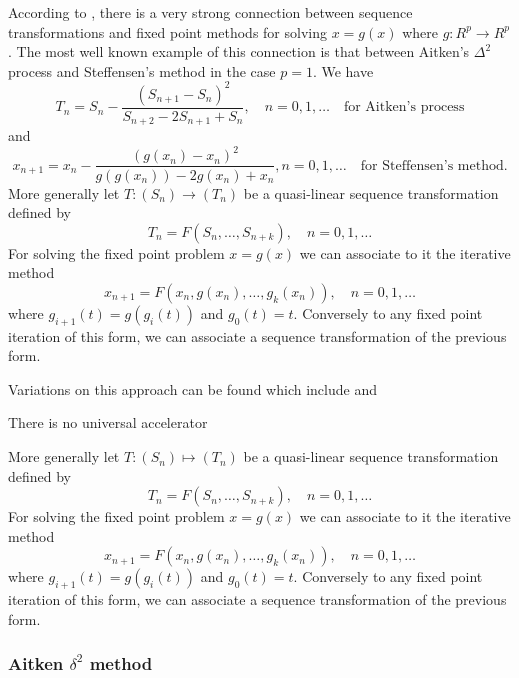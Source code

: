 According to \cite{brezinski}, there is a very strong connection between sequence transformations and fixed point methods for solving \(x=g(x)\) where \(g: R^{p} \to R^{p}\).
The most well known example of this connection is that between Aitken's \(\Delta^{2}\) process and Steffensen's method in the case \(p=1\).
We have
\[T_{n}=S_{n}-\frac{\left(S_{n+1}-S_{n}\right)^{2}}{S_{n+2}-2 S_{n+1}+S_{n}}, \quad n=0,1, \ldots \quad\text{for Aitken's process}\]
and
\[x_{n+1}=x_{n}-\frac{\left(g\left(x_{n}\right)-x_{n}\right)^{2}}{g\left(g\left(x_{n}\right)\right)-2 g\left(x_{n}\right)+x_{n}}, n=0,1, \ldots \quad\text{for Steffensen's method.}\]
More generally let \(T:\left(S_{n}\right) \to\left(T_{n}\right)\) be a quasi-linear sequence transformation defined by
\[
T_{n}=F\left(S_{n}, \ldots, S_{n+k}\right), \quad n=0,1, \ldots
\]
For solving the fixed point problem \(x=g(x)\) we can associate to it the iterative method
\[
x_{n+1}=F\left(x_{n}, g\left(x_{n}\right), \ldots, g_{k}\left(x_{n}\right)\right), \quad n=0,1, \ldots
\]
where \(g_{i+1}(t)=g\left(g_{i}(t)\right)\) and \(g_{0}(t)=t\).
Conversely to any fixed point iteration of this form, we can associate a sequence transformation of the previous form.

Variations on this approach can be found which include \cite{irons_version_1969} and \cite{king}

There is no universal accelerator \cite{brezinski}





More generally let \(T:\left(S_{n}\right) \longmapsto\left(T_{n}\right)\) be a quasi-linear sequence transformation defined by
\[
T_{n}=F\left(S_{n}, \ldots, S_{n+k}\right), \quad n=0,1, \ldots
\]
For solving the fixed point problem \(x=g(x)\) we can associate to it the iterative method
\[
x_{n+1}=F\left(x_{n}, g\left(x_{n}\right), \ldots, g_{k}\left(x_{n}\right)\right), \quad n=0,1, \ldots
\]
where \(g_{i+1}(t)=g\left(g_{i}(t)\right)\) and \(g_{0}(t)=t\). Conversely to any fixed point iteration of this form, we can associate a sequence transformation of the previous form.

\subsubsection{Aitken \(\delta^2\) method}

